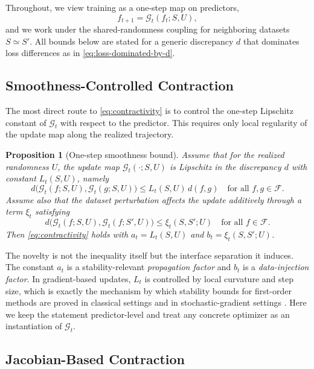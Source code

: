 \documentclass{article}
\newtheorem{proposition}[theorem]{Proposition}
\numberwithin{equation}{section}
\begin{document}
Throughout, we view training as a one-step map on predictors,
\[
f_{t+1} = \mathcal{G}_t(f_t;S,U),
\]
and we work under the shared-randomness coupling for neighboring datasets $S\simeq S'$.
All bounds below are stated for a generic discrepancy $d$ that dominates loss differences as in \eqref{eq:loss-dominated-by-d}.

\subsection{Smoothness-Controlled Contraction}
\label{subsec:smoothness}

The most direct route to \eqref{eq:contractivity} is to control the one-step Lipschitz constant of $\mathcal{G}_t$ with respect to the predictor.
This requires only local regularity of the update map along the realized trajectory.

\begin{proposition}[One-step smoothness bound]
	\label{prop:smoothness}
	Assume that for the realized randomness $U$, the update map $\mathcal{G}_t(\cdot;S,U)$ is Lipschitz in the discrepancy $d$ with constant $L_t(S,U)$, namely
	\[
	d\!\big(\mathcal{G}_t(f;S,U),\mathcal{G}_t(g;S,U)\big)\le L_t(S,U)\, d(f,g)
	\quad \text{for all } f,g\in\mathcal{F}.
	\]
	Assume also that the dataset perturbation affects the update additively through a term $\xi_t$ satisfying
	\[
	d\!\big(\mathcal{G}_t(f;S,U),\mathcal{G}_t(f;S',U)\big)\le \xi_t(S,S';U)
	\quad \text{for all } f\in\mathcal{F}.
	\]
	Then \eqref{eq:contractivity} holds with $a_t=L_t(S,U)$ and $b_t=\xi_t(S,S';U)$.
\end{proposition}

The novelty is not the inequality itself but the interface separation it induces.
The constant $a_t$ is a stability-relevant \emph{propagation factor} and $b_t$ is a \emph{data-injection factor}.
In gradient-based updates, $L_t$ is controlled by local curvature and step size, which is exactly the mechanism by which stability bounds for first-order methods are proved in classical settings \cite{nesterov2004introductory} and in stochastic-gradient settings \cite{pmlr-v48-hardt16}.
Here we keep the statement predictor-level and treat any concrete optimizer as an instantiation of $\mathcal{G}_t$.

\subsection{Jacobian-Based Contraction}
\label{subsec:jacobian}
\end{document}
